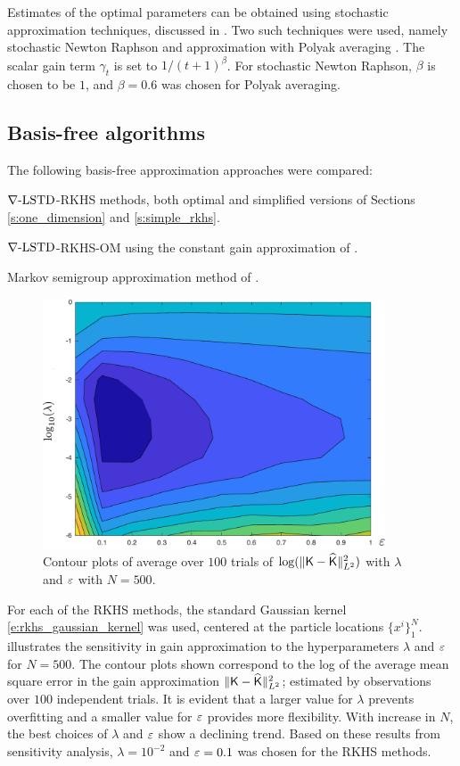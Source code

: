 Estimates of the optimal parameters can be obtained using stochastic approximation techniques, discussed in . Two such techniques were used, namely stochastic Newton Raphson and approximation with Polyak averaging \cite{bor08a}. The scalar gain term $\gamma_t$ is set to $1/(t+1)^{\beta}$. For stochastic Newton Raphson, $\beta$ is chosen to be $1$, and $\beta=0.6$ was chosen for Polyak averaging.

\subsection*{Basis-free algorithms}
The following basis-free approximation approaches were compared:
\begin{romannum}
\item $\nabla\text{-LSTD}$-RKHS methods, both optimal and simplified versions of Sections \ref{s:one_dimension} and \ref{s:simple_rkhs}.
\item $\nabla\text{-LSTD}$-RKHS-OM using the constant gain approximation of .
\item Markov semigroup approximation method of .
\end{romannum}
\begin{figure}[htbp]
	\centering
	\includegraphics[width = 4in]{images/Chap4_log_mse_contour_2m}
	\caption{Contour plots of average over $100$ trials of $\log(\|\text{\sf K} - \widehat{\text{\sf K}}\|^2_{L^2})$ with $\lambda$ and $\varepsilon$ with $N=500$.}
	\label{fig:log_mse_contour}
\end{figure}
 For each of the RKHS methods, the standard Gaussian kernel \eqref{e:rkhs_gaussian_kernel} was used, centered at the particle locations $\{x^i\}_1^N$.  illustrates the sensitivity in gain approximation to the hyperparameters $\lambda$ and $\varepsilon$ for $N=500$. The contour plots shown correspond to the log of the average mean square error in the gain approximation $\|\text{\sf K} - \widehat{\text{\sf K}} \|^2_{L^2}$; estimated by observations over $100$ independent trials. It is evident that a larger value for $\lambda$ prevents overfitting and a smaller value for $\varepsilon$ provides more flexibility. With increase in $N$, the best choices of $\lambda$ and $\varepsilon$ show a declining trend. Based on these results from sensitivity analysis, $\lambda = 10^{-2}$ and $\varepsilon = 0.1$ was chosen for the RKHS methods.

